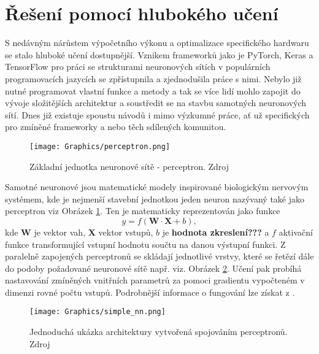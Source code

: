\documentclass[czech, bc, kky, he, iso690alph]{fasthesis}
\begin{document}
        \section{Řešení pomocí hlubokého učení}
        	S nedávným nárůstem výpočetního výkonu a optimalizace specifického hardwaru se stalo hluboké učení dostupnější. Vznikem frameworků jako je PyTorch, Keras a TensorFlow pro práci se strukturami neuronových sítích v populárních programovacích jazycích se zpřístupnila a zjednodušila práce s nimi. Nebylo již nutné programovat vlastní funkce a metody a tak se více lidí mohlo zapojit do vývoje složitějších architektur a soustředit se na stavbu samotných neuronových sítí. Dnes již existuje spoustu návodů i mimo výzkumné práce, ať už specifických pro zmíněné frameworky a nebo těch sdílených komunitou.
            
	            \begin{figure}[h]
	            	\centering
	            	\texttt{[image: Graphics/perceptron.png]}
	            	\caption{Základní jednotka neuronové sítě - perceptron. Zdroj \cite{neural_networks_background_02}}
	            	\label{pic:perceptron}
	            \end{figure}
	            
            Samotné neuronové jsou matematické modely inspirované biologickým nervovým systémem, kde je nejmenší stavební jednotkou jeden neuron nazývaný také jako perceptron viz Obrázek \ref{pic:perceptron}. Ten je matematicky reprezentován jako funkce 
            \[y=f(\mathbf{W}\cdot\mathbf{X} + b),\]
            kde \(\mathbf{W}\) je vektor vah, \(\mathbf{X}\) vektor vstupů, \(b\) je \textbf{hodnota zkreslení???} a \(f\) aktivační funkce transformující vstupní hodnotu součtu na danou výstupní funkci. Z paralelně zapojených perceptronů se skládají jednotlivé vrstvy, které se řetězí dále do podoby požadované neuronové sítě např. viz. Obrázek \ref{pic:basic_nn}. Učení pak probíhá nastavování zmíněných vnitřních parametrů za pomoci gradientu vypočteném v dimenzi rovné počtu vstupů. Podrobnější informace o fungování lze získat z \cite{neural_networks_background_01,neural_networks_background_02}.
            
	            \begin{figure}[h]
	            	\centering
	            	\texttt{[image: Graphics/simple\_nn.png]}
	            	\caption{Jednoduchá ukázka architektury vytvořená spojováním perceptronů. Zdroj \cite{neural_networks_background_02}}
	            	\label{pic:basic_nn}
	            \end{figure}
            
\end{document}
